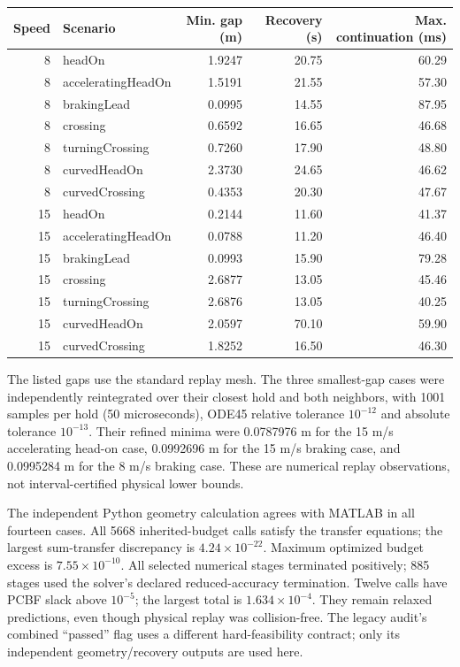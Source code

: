 \documentclass[10pt]{article}
\begin{document}
\begin{longtable}{rlrrr}
\toprule
Speed & Scenario & Min. gap (m) & Recovery (s) & Max. continuation (ms)\\
\midrule\endhead
8 & headOn & 1.9247 & 20.75 & 60.29 \\
8 & acceleratingHeadOn & 1.5191 & 21.55 & 57.30 \\
8 & brakingLead & 0.0995 & 14.55 & 87.95 \\
8 & crossing & 0.6592 & 16.65 & 46.68 \\
8 & turningCrossing & 0.7260 & 17.90 & 48.80 \\
8 & curvedHeadOn & 2.3730 & 24.65 & 46.62 \\
8 & curvedCrossing & 0.4353 & 20.30 & 47.67 \\
15 & headOn & 0.2144 & 11.60 & 41.37 \\
15 & acceleratingHeadOn & 0.0788 & 11.20 & 46.40 \\
15 & brakingLead & 0.0993 & 15.90 & 79.28 \\
15 & crossing & 2.6877 & 13.05 & 45.46 \\
15 & turningCrossing & 2.6876 & 13.05 & 40.25 \\
15 & curvedHeadOn & 2.0597 & 70.10 & 59.90 \\
15 & curvedCrossing & 1.8252 & 16.50 & 46.30 \\
\bottomrule
\end{longtable}
The listed gaps use the standard replay mesh. The three smallest-gap cases were
independently reintegrated over their closest hold and both neighbors, with 1001
samples per hold (50 microseconds), ODE45 relative tolerance $10^{-12}$ and
absolute tolerance $10^{-13}$. Their refined minima were 0.0787976 m for the
15 m/s accelerating head-on case, 0.0992696 m for the 15 m/s braking case, and
0.0995284 m for the 8 m/s braking case. These are numerical replay observations,
not interval-certified physical lower bounds.

The independent Python geometry calculation agrees with MATLAB in all fourteen
cases. All 5668 inherited-budget calls satisfy the transfer equations; the largest
sum-transfer discrepancy is $4.24\times10^{-22}$. Maximum optimized budget excess
is $7.55\times10^{-10}$. All selected numerical stages terminated positively;
885 stages used the solver's declared reduced-accuracy termination. Twelve calls
have PCBF slack above $10^{-5}$; the largest total is $1.634\times10^{-4}$.
They remain relaxed predictions, even though physical replay was collision-free.
The legacy audit's combined ``passed'' flag uses a different hard-feasibility
contract; only its independent geometry/recovery outputs are used here.
\end{document}
